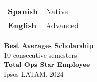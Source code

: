 \documentclass[a4paper,10pt]{article}
\newcommand{\cvitem}[2]{
    \small\textbf{#1} & #2 \\[2pt]
}
\begin{document}
\begin{minipage}[t]{0.34\textwidth}
    \begin{tcolorbox}[title={\textbf{\textcolor{primary}{Languages}}}, fonttitle=\normalsize]
        \begin{tabular}{@{}ll@{}}
            \cvitem{Spanish}{Native}
            \cvitem{English}{Advanced}
        \end{tabular}
    \end{tcolorbox}
    
    \vspace{0.25cm} %
    
    \begin{tcolorbox}[title={\textbf{\textcolor{primary}{Distinctions}}}, fonttitle=\normalsize]
        \small
        \textbf{Best Averages Scholarship}\\
        10 consecutive semesters\\[0.3em]
        \textbf{Total Ops Star Employee}\\
        Ipsos LATAM, 2024
    \end{tcolorbox}
\end{minipage}
\end{document}
